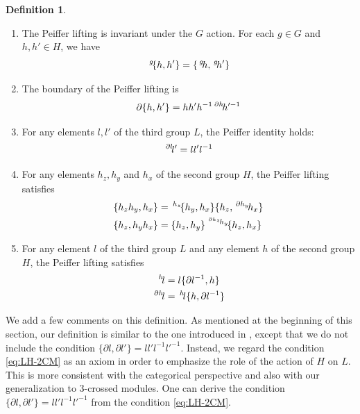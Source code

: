 \documentclass[11pt, reqno]{amsart} %
\newcommand{\act}[1]{\,\sp{#1}\!}
\theoremstyle{definition}
\newtheorem{definition}[theorem]{Definition}
\theoremstyle{remark}
\numberwithin{equation}{section}
\begin{document}
\begin{definition}
\begin{enumerate}
  \item \label{ax:2CM-GonPeiffer}The Peiffer lifting is invariant under the $G$ action. For each $g\in G$ and $h,h'\in H$, we have
  \[
    \act{g}\{h,h'\} = \{\act{g}h,\act{g}h'\}
  \]
  \item \label{ax:2CM-BoundaryPeiffer}The boundary of the Peiffer lifting is
  \begin{equation}
    \label{eq:2CM-bPeiffer}
    \partial\{h,h'\} = hh'h^{-1}\act{\partial h}h'^{-1}
  \end{equation}
  \item For any elements $l,l'$ of the third group $L$, the Peiffer identity holds:
  \begin{equation}
    \label{eq:2CM-Peifferid}
    \act{\partial l}l' = ll'l^{-1}
  \end{equation}
  \item For any elements $h_z,h_y$ and $h_x$ of the second group $H$, the Peiffer lifting satisfies
  \begin{align}
    \label{eq:HH_H-2CM}
    \{h_zh_y,h_x\} &= \act{h_z}\{h_y,h_x\}\{h_z,\act{\partial h_y}h_x\} \\
    \label{eq:H_HH-2CM}
    \{h_z,h_yh_x\} &= \{h_z,h_y\}\act{\act{\partial h_z}h_y}\{h_z,h_x\}
  \end{align}
  \item \label{ax:2CM-Hactions}For any element $l$ of the third group $L$ and any element $h$ of the second group $H$, the Peiffer lifting satisfies
  \begin{align}
    \label{eq:LH-2CM}
    \act{h}l &= l\{\partial l^{-1},h\} \\
    \label{eq:HL-2CM}
    \act{\partial h}l &= \act{h}l\{h,\partial l^{-1}\}
  \end{align}
\end{enumerate}
\end{definition}

We add a few comments on this definition. As mentioned at the beginning of this section, our definition is similar to the one introduced in \cite{Sarikaya:2024}, except that we do not include the condition $\{\partial l,\partial l'\} = ll'l^{-1}l'^{-1}$. Instead, we regard the condition \eqref{eq:LH-2CM} as an axiom in order to emphasize the role of the action of $H$ on $L$. This is more consistent with the categorical perspective and also with our generalization to 3-crossed modules. One can derive the condition $\{\partial l,\partial l'\} = ll'l^{-1}l'^{-1}$ from the condition \eqref{eq:LH-2CM}. 
\end{document}
